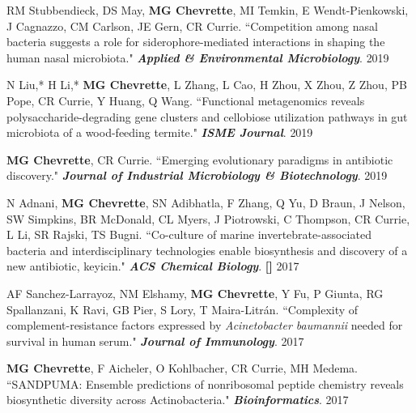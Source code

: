 \begin{cvpubs}
\cvpub
{RM Stubbendieck, DS May, \textbf{MG Chevrette}, MI Temkin, E Wendt-Pienkowski, J Cagnazzo, CM Carlson, JE Gern, CR Currie. ``Competition among nasal bacteria suggests a role for siderophore-mediated interactions in shaping the human nasal microbiota." \textit{\textbf{Applied \& Environmental Microbiology}}. \textbf{\textit{}}}
{2019}

\cvpub
{N Liu,* H Li,* \textbf{MG Chevrette}, L Zhang, L Cao, H Zhou, X Zhou, Z Zhou, PB Pope, CR Currie, Y Huang, Q Wang. ``Functional metagenomics reveals polysaccharide-degrading gene clusters and cellobiose utilization pathways in gut microbiota of a wood-feeding termite." \textit{\textbf{ISME Journal}}. \textbf{\textit{}}}
{2019}

\cvpub
{\textbf{MG Chevrette}, CR Currie. ``Emerging evolutionary paradigms in antibiotic discovery." \textit{\textbf{Journal of Industrial Microbiology \& Biotechnology}}. \textbf{\textit{}}}
{2019}

\cvpub
{N Adnani, \textbf{MG Chevrette}, SN Adibhatla, F Zhang, Q Yu, D Braun, J Nelson, SW Simpkins, BR McDonald, CL Myers, J Piotrowski, C Thompson, CR Currie, L Li, SR Rajski, TS Bugni. ``Co-culture of marine invertebrate-associated bacteria and interdisciplinary technologies enable biosynthesis and discovery of a new antibiotic, keyicin." \textit{\textbf{ACS Chemical Biology}}.  \textbf{\textit{}} \linebreak \textbf{[\textit{}]}}
{2017}

\cvpub
{AF Sanchez-Larrayoz, NM Elshamy, \textbf{MG Chevrette}, Y Fu, P Giunta, RG Spallanzani, K Ravi, GB Pier, S Lory, T Maira-Litr\'{a}n. ``Complexity of complement-resistance factors expressed by \textit{Acinetobacter baumannii} needed for survival in human serum." \textit{\textbf{Journal of Immunology}}. \textbf{\textit{}}}
{2017}

\cvpub
{\textbf{MG Chevrette}, F Aicheler, O Kohlbacher, CR Currie, MH Medema. ``SANDPUMA: Ensemble predictions of nonribosomal peptide chemistry reveals biosynthetic diversity across Actinobacteria." \textit{\textbf{Bioinformatics}}. \textbf{\textit{}}}
{2017}


\end{cvpubs}
